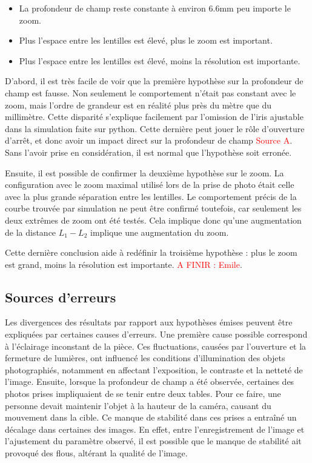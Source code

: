 \documentclass[11pt,letterpaper]{article}
\begin{document}
\begin{itemize}
\item La profondeur de champ reste constante à environ 6.6mm peu importe le zoom.
\item Plus l'espace entre les lentilles est élevé, plus le zoom est important.
\item Plus l'espace entre les lentilles est élevé, moins la résolution est importante.
\end{itemize}

D'abord, il est très facile de voir que la première hypothèse sur la profondeur
de champ est fausse. Non seulement le comportement n'était pas constant avec le zoom,
mais l'ordre de grandeur est en réalité plus près du mètre que du millimètre. Cette
disparité s'explique facilement par l'omission de l'iris ajustable dans la simulation
faite sur python. Cette dernière peut jouer le rôle d'ouverture d'arrêt, et donc avoir
un impact direct sur la profondeur de champ \textcolor{red}{Source A}. Sans l'avoir 
prise en considération, il est normal que l'hypothèse soit erronée.


Ensuite, il est possible de confirmer la deuxième hypothèse sur le zoom. La
configuration avec le zoom maximal utilisé lors de la prise de photo était celle avec
la plus grande séparation entre les lentilles. Le comportement précis de la courbe
trouvée par simulation ne peut être confirmé toutefois, car seulement les deux extrêmes
de zoom ont été testés. Cela implique donc qu'une augmentation de la distance $L_1 - L_2$ implique une augmentation du zoom.

Cette dernière conclusion aide à redéfinir la troisième hypothèse : plus le zoom est
grand, moins la résolution est importante. \textcolor{red}{A FINIR : Emile}.

\subsection{Sources d'erreurs}
Les divergences des résultats par rapport aux hypothèses émises peuvent être expliquées par certaines causes d'erreurs. Une première cause possible correspond à l'éclairage inconstant de la pièce. Ces fluctuations, causées par l'ouverture et la fermeture de lumières, ont influencé les conditions d'illumination des objets photographiés, notamment en affectant l'exposition, le contraste et la netteté de l'image. Ensuite, lorsque la profondeur de champ a été observée, certaines des photos prises impliquaient de se tenir entre deux tables. Pour ce faire, une personne devait maintenir l'objet à la hauteur de la caméra, causant du mouvement dans la cible. Ce manque de stabilité dans ces prises a entraîné un décalage dans certaines des images. En effet, entre l'enregistrement de l'image et l'ajustement du paramètre observé, il est possible que le manque de stabilité ait provoqué des flous, altérant la qualité de l'image. 
\end{document}
